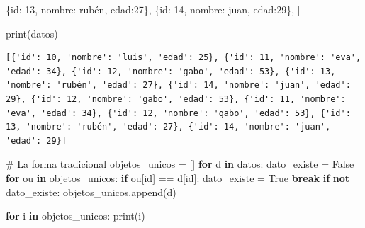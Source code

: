 \documentclass[
  spanish,
  letterpaper,
]{scrbook}
\newenvironment{Shaded}{\begin{snugshade}}{\end{snugshade}}
\newcommand{\BuiltInTok}[1]{\textcolor[rgb]{0.00,0.23,0.31}{#1}}
\newcommand{\CommentTok}[1]{\textcolor[rgb]{0.37,0.37,0.37}{#1}}
\newcommand{\ControlFlowTok}[1]{\textcolor[rgb]{0.00,0.23,0.31}{\textbf{#1}}}
\newcommand{\DecValTok}[1]{\textcolor[rgb]{0.68,0.00,0.00}{#1}}
\newcommand{\KeywordTok}[1]{\textcolor[rgb]{0.00,0.23,0.31}{\textbf{#1}}}
\newcommand{\NormalTok}[1]{\textcolor[rgb]{0.00,0.23,0.31}{#1}}
\newcommand{\OperatorTok}[1]{\textcolor[rgb]{0.37,0.37,0.37}{#1}}
\newcommand{\StringTok}[1]{\textcolor[rgb]{0.13,0.47,0.30}{#1}}
\newcommand{\VariableTok}[1]{\textcolor[rgb]{0.07,0.07,0.07}{#1}}
\theoremstyle{definition}
\theoremstyle{remark}
\begin{document}
\begin{Shaded}
\begin{Highlighting}[]
\NormalTok{  \{}\StringTok{\textquotesingle{}id\textquotesingle{}}\NormalTok{: }\DecValTok{13}\NormalTok{, }\StringTok{\textquotesingle{}nombre\textquotesingle{}}\NormalTok{: }\StringTok{\textquotesingle{}rubén\textquotesingle{}}\NormalTok{, }\StringTok{\textquotesingle{}edad\textquotesingle{}}\NormalTok{:}\DecValTok{27}\NormalTok{\},}
\NormalTok{  \{}\StringTok{\textquotesingle{}id\textquotesingle{}}\NormalTok{: }\DecValTok{14}\NormalTok{, }\StringTok{\textquotesingle{}nombre\textquotesingle{}}\NormalTok{: }\StringTok{\textquotesingle{}juan\textquotesingle{}}\NormalTok{, }\StringTok{\textquotesingle{}edad\textquotesingle{}}\NormalTok{:}\DecValTok{29}\NormalTok{\},}
\NormalTok{]}

\BuiltInTok{print}\NormalTok{(datos)}
\end{Highlighting}
\end{Shaded}

\begin{verbatim}
[{'id': 10, 'nombre': 'luis', 'edad': 25}, {'id': 11, 'nombre': 'eva', 'edad': 34}, {'id': 12, 'nombre': 'gabo', 'edad': 53}, {'id': 13, 'nombre': 'rubén', 'edad': 27}, {'id': 14, 'nombre': 'juan', 'edad': 29}, {'id': 12, 'nombre': 'gabo', 'edad': 53}, {'id': 11, 'nombre': 'eva', 'edad': 34}, {'id': 12, 'nombre': 'gabo', 'edad': 53}, {'id': 13, 'nombre': 'rubén', 'edad': 27}, {'id': 14, 'nombre': 'juan', 'edad': 29}]
\end{verbatim}

\begin{Shaded}
\begin{Highlighting}[]
\CommentTok{\# La forma tradicional}
\NormalTok{objetos\_unicos }\OperatorTok{=}\NormalTok{ []}
\ControlFlowTok{for}\NormalTok{ d }\KeywordTok{in}\NormalTok{ datos:}
\NormalTok{    dato\_existe }\OperatorTok{=} \VariableTok{False}
    \ControlFlowTok{for}\NormalTok{ ou }\KeywordTok{in}\NormalTok{ objetos\_unicos:}
        \ControlFlowTok{if}\NormalTok{ ou[}\StringTok{\textquotesingle{}id\textquotesingle{}}\NormalTok{] }\OperatorTok{==}\NormalTok{ d[}\StringTok{\textquotesingle{}id\textquotesingle{}}\NormalTok{]:}
\NormalTok{          dato\_existe }\OperatorTok{=} \VariableTok{True}
          \ControlFlowTok{break}
    \ControlFlowTok{if} \KeywordTok{not}\NormalTok{ dato\_existe:}
\NormalTok{        objetos\_unicos.append(d)}

\ControlFlowTok{for}\NormalTok{ i }\KeywordTok{in}\NormalTok{ objetos\_unicos:}
    \BuiltInTok{print}\NormalTok{(i)}
\end{Highlighting}
\end{Shaded}
\end{document}
